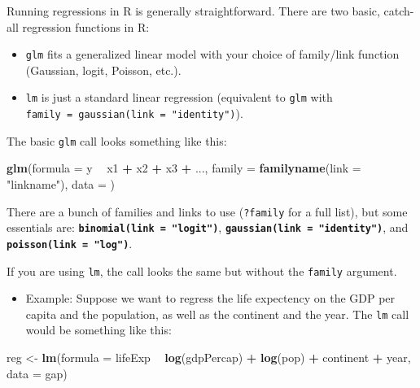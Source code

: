 \documentclass[]{book}
\newenvironment{Shaded}{\begin{snugshade}}{\end{snugshade}}
\newcommand{\KeywordTok}[1]{\textcolor[rgb]{0.13,0.29,0.53}{\textbf{#1}}}
\newcommand{\DataTypeTok}[1]{\textcolor[rgb]{0.13,0.29,0.53}{#1}}
\newcommand{\StringTok}[1]{\textcolor[rgb]{0.31,0.60,0.02}{#1}}
\newcommand{\OperatorTok}[1]{\textcolor[rgb]{0.81,0.36,0.00}{\textbf{#1}}}
\newcommand{\NormalTok}[1]{#1}
\providecommand{\tightlist}{%
  \setlength{\itemsep}{0pt}\setlength{\parskip}{0pt}}
\begin{document}
Running regressions in R is generally straightforward. There are two
basic, catch-all regression functions in R:

\begin{itemize}
\item
  \texttt{glm} fits a generalized linear model with your choice of
  family/link function (Gaussian, logit, Poisson, etc.).
\item
  \texttt{lm} is just a standard linear regression (equivalent to
  \texttt{glm} with \texttt{family\ =\ gaussian(link\ =\ "identity")}).
\end{itemize}

The basic \texttt{glm} call looks something like this:

\begin{Shaded}
\begin{Highlighting}[]
\KeywordTok{glm}\NormalTok{(}\DataTypeTok{formula =}\NormalTok{ y }\OperatorTok{~}\StringTok{ }\NormalTok{x1 }\OperatorTok{+}\StringTok{ }\NormalTok{x2 }\OperatorTok{+}\StringTok{ }\NormalTok{x3 }\OperatorTok{+}\StringTok{ }\NormalTok{..., }\DataTypeTok{family =} \KeywordTok{familyname}\NormalTok{(}\DataTypeTok{link =} \StringTok{"linkname"}\NormalTok{), }\DataTypeTok{data =}\NormalTok{ )}
\end{Highlighting}
\end{Shaded}

There are a bunch of families and links to use (\texttt{?family} for a
full list), but some essentials are:
\textbf{\texttt{binomial(link\ =\ "logit")}},
\textbf{\texttt{gaussian(link\ =\ "identity")}}, and
\textbf{\texttt{poisson(link\ =\ "log")}}.

If you are using \texttt{lm}, the call looks the same but without the
\texttt{family} argument.

\begin{itemize}
\tightlist
\item
  Example: Suppose we want to regress the life expectency on the GDP per
  capita and the population, as well as the continent and the year. The
  \texttt{lm} call would be something like this:
\end{itemize}

\begin{Shaded}
\begin{Highlighting}[]
\NormalTok{reg <-}\StringTok{ }\KeywordTok{lm}\NormalTok{(}\DataTypeTok{formula =}\NormalTok{ lifeExp }\OperatorTok{~}\StringTok{ }\KeywordTok{log}\NormalTok{(gdpPercap) }\OperatorTok{+}\StringTok{ }\KeywordTok{log}\NormalTok{(pop) }\OperatorTok{+}\StringTok{ }\NormalTok{continent }\OperatorTok{+}\StringTok{ }\NormalTok{year, }\DataTypeTok{data =}\NormalTok{ gap)}
\end{Highlighting}
\end{Shaded}
\end{document}
